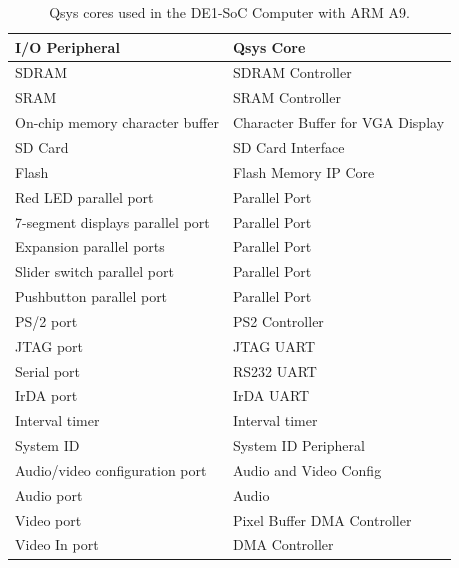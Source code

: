 \documentclass[11pt, twoside, pdftex]{article}
\newcommand{\commonFiles}{../../../common/doc}
\newcommand{\systemNameFull}{DE1-SoC Computer with ARM A9}
\begin{document}
\newpage

\begin{table}[h]
    \begin{center}
    \begin{tabular}{l|l}
            \textbf{I/O Peripheral}
            & \textbf{Qsys Core}
        \\\hline
            \rule{0in}{0.2in}SDRAM
            & SDRAM Controller
        \\
            SRAM
        &   SRAM Controller
        \\
            On-chip memory character buffer
				& Character Buffer for VGA Display
        \\
            SD Card
        &   SD Card Interface
        \\
            Flash
        &   Flash Memory IP Core
        \\
            Red LED parallel port
				& Parallel Port
        \\
            7-segment displays parallel port
				& Parallel Port
        \\
            Expansion parallel ports
				& Parallel Port
        \\
            Slider switch parallel port
				& Parallel Port
        \\
            Pushbutton parallel port
				& Parallel Port
        \\
            PS/2 port
				& PS2 Controller
        \\
            JTAG port
				& JTAG UART
        \\
            Serial port
				& RS232 UART
        \\
            IrDA port
				& IrDA UART
        \\
            Interval timer
				& Interval timer 
        \\
            System ID
				& System ID Peripheral
        \\
            Audio/video configuration port
				& Audio and Video Config
        \\
            Audio port
				& Audio
        \\
            Video port
				& Pixel Buffer DMA Controller
        \\
            Video In port
				& DMA Controller
        \\
    \end{tabular}
    \caption{Qsys cores used in the \systemNameFull.}
    \label{tab:sopcnames}
    \end{center}
\end{table}
\clearpage
\end{document}
